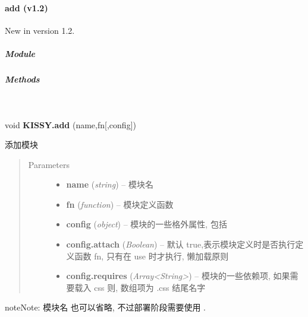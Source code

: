 \documentclass[letterpaper,10pt,english]{sphinxmanual}
\begin{document}
\paragraph{add (v1.2)}
\label{api/seed/loader/add.ver1.2:add-v1-2}\label{api/seed/loader/add.ver1.2::doc}New in version 1.2.

\subparagraph{Module}
\label{api/seed/loader/add.ver1.2:module}\begin{quote}

{\hyperref[api/seed/loader/index:module-Loader]{}}
\end{quote}


\subparagraph{Methods}
\label{api/seed/loader/add.ver1.2:methods}

\begin{fulllineitems}
\label{api/seed/loader/add.ver1.2:Loader.KISSY.add}~
\begin{DUlineblock}{0em}
\item[] void \textbf{KISSY.add} (name,fn{[},config{]})
\item[] 添加模块
\end{DUlineblock}
\begin{quote}\begin{description}
\item[{Parameters}] \leavevmode\begin{itemize}
\item {}
\textbf{name} (\emph{string}) -- 模块名

\item {}
\textbf{fn} (\emph{function}) -- 模块定义函数

\item {}
\textbf{config} (\emph{object}) -- 模块的一些格外属性, 包括

\item {}
\textbf{config.attach} (\emph{Boolean}) -- 默认 true,表示模块定义时是否执行定义函数 fn, 只有在 use 时才执行, 懒加载原则

\item {}
\textbf{config.requires} (\emph{Array\textless{}String\textgreater{}}) -- 模块的一些依赖项, 如果需要载入 css 则, 数组项为 .css 结尾名字

\end{itemize}

\end{description}\end{quote}

\begin{notice}{note}{Note:}
模块名  也可以省略, 不过部署阶段需要使用 {\hyperref[tools/module-compiler/index:module-module-compiler]{}} .
\end{notice}


\end{fulllineitems}
\end{document}
